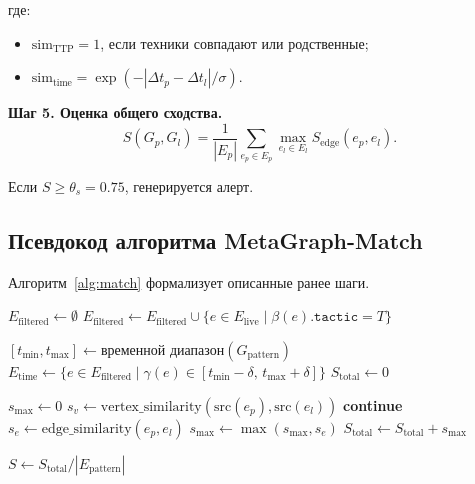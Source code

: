 где:

\noindent
\begin{itemize} 
    \item $\text{sim}_{\text{TTP}} = 1$, если техники совпадают или родственные;
    \item $\text{sim}_{\text{time}} = \exp(-|\Delta t_p - \Delta t_l| / \sigma)$.
\end{itemize}
\textbf{Шаг 5. Оценка общего сходства.}
\begin{equation}
    S(G_p, G_l) = \frac{1}{|E_p|} \sum_{e_p \in E_p} \max_{e_l \in E_l} S_{\text{edge}}(e_p, e_l).
    \label{eq:total_sim}
\end{equation}

Если $S \geq \theta_s = 0.75$, генерируется алерт.

\subsection{Псевдокод алгоритма MetaGraph-Match}

Алгоритм~\ref{alg:match} формализует описанные ранее шаги.

\begin{algorithm}[H]
\caption{MetaGraph-Match($G_{\text{pattern}}, G_{\text{live}}, \theta_v, \theta_s$)}\label{alg:match}
\begin{algorithmic}[1]

\State $E_{\text{filtered}} \gets \emptyset$
    \State $E_{\text{filtered}} \gets E_{\text{filtered}} \cup \{ e \in E_{\text{live}} \mid \beta(e).\texttt{tactic} = T \}$
\EndFor

\State $[t_{\min}, t_{\max}] \gets \text{временной диапазон}(G_{\text{pattern}})$
\State $E_{\text{time}} \gets \{ e \in E_{\text{filtered}} \mid \gamma(e) \in [t_{\min} - \delta,\, t_{\max} + \delta] \}$
\State $S_{\text{total}} \gets 0$

    \State $s_{\max} \gets 0$
        \State $s_v \gets \text{vertex\_similarity}(\mathrm{src}(e_p), \mathrm{src}(e_l))$
            \State \textbf{continue}
        \EndIf
        \State $s_e \gets \text{edge\_similarity}(e_p, e_l)$
        \State $s_{\max} \gets \max(s_{\max}, s_e)$
    \EndFor
    \State $S_{\text{total}} \gets S_{\text{total}} + s_{\max}$
\EndFor

\State $S \gets S_{\text{total}} / |E_{\text{pattern}}|$
\State {}
\end{algorithmic}
\end{algorithm}

